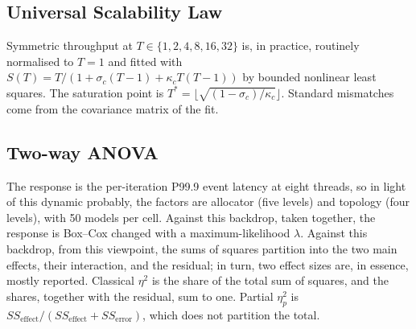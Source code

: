 \subsection{Universal Scalability Law}
Symmetric throughput at $T\in\{1,2,4,8,16,32\}$ is, in practice, routinely normalised to $T=1$ and fitted with
$S(T)=T/(1+\sigma_c(T-1)+\kappa_c T(T-1))$ by bounded nonlinear least squares. The saturation
point is $T^*=\lfloor\sqrt{(1-\sigma_c)/\kappa_c}\rfloor$. Standard mismatches come from the
covariance matrix of the fit.

\subsection{Two-way ANOVA}
The response is the per-iteration P99.9 event latency at eight threads, so in light of this dynamic probably, the factors are
allocator (five levels) and topology (four levels), with 50 models per cell. Against this backdrop, taken together, the response
is Box--Cox changed with a maximum-likelihood $\lambda$. Against this backdrop, from this viewpoint, the sums of squares partition
into the two main effects, their interaction, and the residual; in turn, two effect sizes are, in essence, mostly reported.
Classical $\eta^2$ is the share of the total sum of squares, and the shares, together with the
residual, sum to one. Partial $\eta_p^2$ is $SS_{\mathrm{effect}}/(SS_{\mathrm{effect}}+SS_{\mathrm{error}})$,
which does not partition the total.
